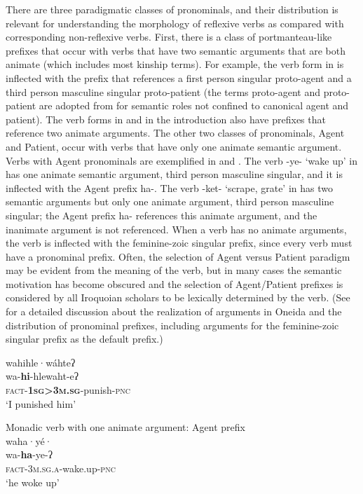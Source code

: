 \documentclass[output=paper]{langscibook}
\begin{document}
There are three paradigmatic classes of pronominals, and their distribution is relevant for understanding the morphology of reflexive verbs as compared with corresponding non-reflexive verbs. First, there is a class of portmanteau-like prefixes that occur with verbs that have two semantic arguments that are both animate (which includes most kinship terms). For example, the verb form in  is inflected with the prefix that references a first person singular proto-agent and a third person masculine singular proto-patient (the terms proto-agent and proto-patient are adopted from \citealt{Dowty1991} for semantic roles not confined to canonical agent and patient). The verb forms in  and  in the introduction also have prefixes that reference two animate arguments. The other two classes of pronominals, Agent and Patient, occur with verbs that have only one animate semantic argument. Verbs with Agent pronominals are exemplified in  and . The verb {-ye-} ‘wake up’ in  has one animate semantic argument, third person masculine singular, and it is inflected with the Agent prefix {ha-}. The verb {{}-ket-} ‘scrape, grate’ in  has two semantic arguments but only one animate argument, third person masculine singular; the Agent prefix {ha-} references this animate argument, and the inanimate argument is not referenced. When a verb has no animate arguments, the verb is inflected with the feminine-zoic singular prefix, since every verb must have a pronominal prefix. Often, the selection of Agent versus Patient paradigm may be evident from the meaning of the verb, but in many cases the semantic motivation has become obscured and the selection of Agent/Patient prefixes is considered by all Iroquoian scholars to be lexically determined by the verb. (See \citealt{KoenigMichelson2015} for a detailed discussion about the realization of arguments in Oneida and the distribution of pronominal prefixes, including arguments for the feminine-zoic singular prefix as the default prefix.)

\ea%
    \label{ex:oneida:3}
    \glll wahihle·wáhteʔ \\
     wa-\textbf{hi}-hlewaht-eʔ\\
        \textsc{fact}-\textbf{\textsc{1sg>3m.sg}}-punish-\textsc{pnc}\\
    \glt ‘I punished him’
    \z


\ea%
Monadic verb with one animate argument: Agent prefix\\
    \label{ex:oneida:4}
    \glll waha·yé·\\
     wa-\textbf{ha}-ye-ʔ\\
       \textsc{fact-}{\textsc{3m.sg.a}}-wake.up-\textsc{pnc} \\
   \glt ‘he woke up’
   \z
\end{document}
